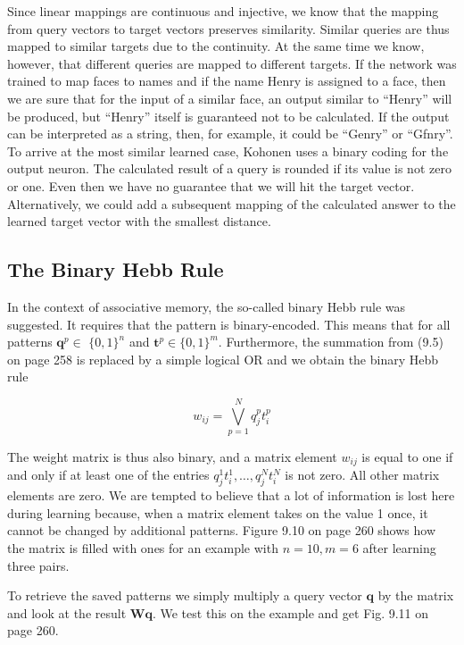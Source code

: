 \documentclass[10pt]{book}
\begin{document}
Since linear mappings are continuous and injective, we know that the mapping from query vectors to target vectors preserves similarity. Similar queries are thus mapped to similar targets due to the continuity. At the same time we know, however, that different queries are mapped to different targets. If the network was trained to map faces to names and if the name Henry is assigned to a face, then we are sure that for the input of a similar face, an output similar to ``Henry'' will be produced, but ``Henry'' itself is guaranteed not to be calculated. If the output can be interpreted as a string, then, for example, it could be ``Genry'' or ``Gfnry''. To arrive at the most similar learned case, Kohonen uses a binary coding for the output neuron. The calculated result of a query is rounded if its value is not zero or one. Even then we have no guarantee that we will hit the target vector. Alternatively, we could add a subsequent mapping of the calculated answer to the learned target vector with the smallest distance.

\subsection{The Binary Hebb Rule}
In the context of associative memory, the so-called binary Hebb rule was suggested. It requires that the pattern is binary-encoded. This means that for all patterns $\boldsymbol{q}^{p} \in$ $\{0,1\}^{n}$ and $\boldsymbol{t}^{p} \in\{0,1\}^{m}$. Furthermore, the summation from (9.5) on page 258 is replaced by a simple logical OR and we obtain the binary Hebb rule

\begin{equation*}
w_{i j}=\bigvee_{p=1}^{N} q_{j}^{p} t_{i}^{p} \tag{9.10}
\end{equation*}

The weight matrix is thus also binary, and a matrix element $w_{i j}$ is equal to one if and only if at least one of the entries $q_{j}^{1} t_{i}^{1}, \ldots, q_{j}^{N} t_{i}^{N}$ is not zero. All other matrix elements are zero. We are tempted to believe that a lot of information is lost here during learning because, when a matrix element takes on the value 1 once, it cannot be changed by additional patterns. Figure 9.10 on page 260 shows how the matrix is filled with ones for an example with $n=10, m=6$ after learning three pairs.

To retrieve the saved patterns we simply multiply a query vector $\boldsymbol{q}$ by the matrix and look at the result $\boldsymbol{W} \boldsymbol{q}$. We test this on the example and get Fig. 9.11 on page 260.
\end{document}
